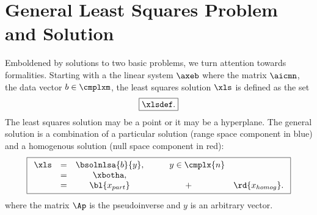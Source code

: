 \section{\label{sec:lsp}General Least Squares Problem and Solution}  %
Emboldened by solutions to two basic problems, we turn attention towards formalities. Starting with a the linear system $\axeb$ where the matrix $\aicmn$, the data vector $b\in\cmplxm$, the least squares solution $\xls$ is defined as the set
  \begin{equation}   %
  \boxed{
    \xlsdef .
    \label{eq:xlsdef}
	}
  \end{equation}
The least squares solution may be a point or it may be a hyperplane. The general solution is a combination of a particular solution (range space component in blue) and a homogenous solution (null space component in red):
  \begin{equation}   %
  \boxed{
   \begin{array}{cccccl}
     \xls 
       & = & \bsolnlsa{b}{y}, & \qquad y \in \cmplx{n} \\
       & = & \xbotha, \\
       & = & \bl{x_{part}} & + & \rd{x_{homog}} .
    \label{eq:general soln}
   \end{array}
  }
  \end{equation}
where the matrix $\Ap$ is the pseudoinverse and $y$ is an arbitrary vector.


\endinput
